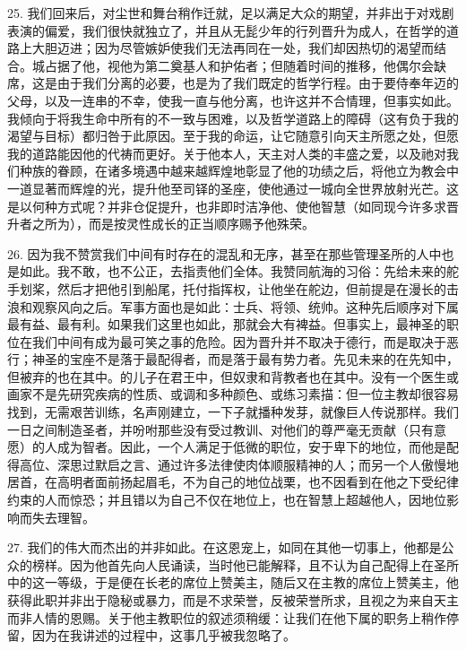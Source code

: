 25. 我们回来后，对尘世和舞台稍作迁就，足以满足大众的期望，并非出于对戏剧表演的偏爱，我们很快就独立了，并且从无髭少年的行列晋升为成人，在哲学的道路上大胆迈进；因为尽管嫉妒使我们无法再同在一处，我们却因热切的渴望而结合。城占据了他，视他为第二奠基人和护佑者；但随着时间的推移，他偶尔会缺席，这是由于我们分离的必要，也是为了我们既定的哲学行程。由于要侍奉年迈的父母，以及一连串的不幸，使我一直与他分离，也许这并不合情理，但事实如此。我倾向于将我生命中所有的不一致与困难，以及哲学道路上的障碍（这有负于我的渴望与目标）都归咎于此原因。至于我的命运，让它随意引向天主所愿之处，但愿我的道路能因他的代祷而更好。关于他本人，天主对人类的丰盛之爱，以及祂对我们种族的眷顾，在诸多境遇中越来越辉煌地彰显了他的功绩之后，将他立为教会中一道显著而辉煌的光，提升他至司铎的圣座，使他通过一城向全世界放射光芒。这是以何种方式呢？并非仓促提升，也非即时洁净他、使他智慧（如同现今许多求晋升者之所为），而是按灵性成长的正当顺序赐予他殊荣。\par

26. 因为我不赞赏我们中间有时存在的混乱和无序，甚至在那些管理圣所的人中也是如此。我不敢，也不公正，去指责他们全体。我赞同航海的习俗：先给未来的舵手划桨，然后才把他引到船尾，托付指挥权，让他坐在舵边，但前提是在漫长的击浪和观察风向之后。军事方面也是如此：士兵、将领、统帅。这种先后顺序对下属最有益、最有利。如果我们这里也如此，那就会大有裨益。但事实上，最神圣的职位在我们中间有成为最可笑之事的危险。因为晋升并不取决于德行，而是取决于恶行；神圣的宝座不是落于最配得者，而是落于最有势力者。先见未来的在先知中，但被弃的也在其中。的儿子在君王中，但奴隶和背教者也在其中。没有一个医生或画家不是先研究疾病的性质、或调和多种颜色、或练习素描：但一位主教却很容易找到，无需艰苦训练，名声刚建立，一下子就播种发芽，就像巨人传说那样。我们一日之间制造圣者，并吩咐那些没有受过教训、对他们的尊严毫无贡献（只有意愿）的人成为智者。因此，一个人满足于低微的职位，安于卑下的地位，而他是配得高位、深思过默启之言、通过许多法律使肉体顺服精神的人；而另一个人傲慢地居首，在高明者面前扬起眉毛，不为自己的地位战栗，也不因看到在他之下受纪律约束的人而惊恐；并且错以为自己不仅在地位上，也在智慧上超越他人，因地位影响而失去理智。\par

27. 我们的伟大而杰出的并非如此。在这恩宠上，如同在其他一切事上，他都是公众的榜样。因为他首先向人民诵读，当时他已能解释，且不认为自己配得上在圣所中的这一等级，于是便在长老的席位上赞美主，随后又在主教的席位上赞美主，他获得此职并非出于隐秘或暴力，而是不求荣誉，反被荣誉所求，且视之为来自天主而非人情的恩赐。关于他主教职位的叙述须稍缓：让我们在他下属的职务上稍作停留，因为在我讲述的过程中，这事几乎被我忽略了。\par

